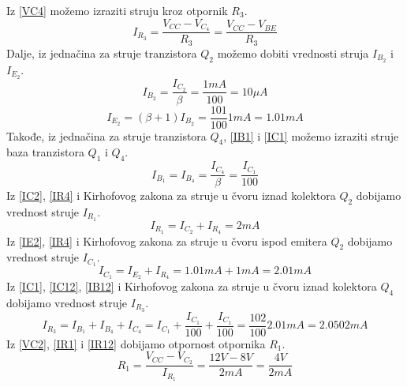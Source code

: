 \documentclass{article}
\begin{document}
            Iz \eqref{VC4} možemo izraziti struju kroz otpornik $R_3$.
            \begin{equation}
                \label{IR3}
                I_{R_3} = \frac{V_{CC} - V_{C_4}}{R_3} = \frac{V_{CC} - V_{BE}}{R_3}
            \end{equation}
            Dalje, iz jednačina za struje tranzistora $Q_2$ možemo dobiti vrednosti struja $I_{B_2}$ i $I_{E_2}$.
            \begin{equation}
                \label{IB22}
                I_{B_2} = \frac{I_{C_2}}{\beta} = \frac{1mA}{100} = 10\mu A
            \end{equation}
            \begin{equation}
                \label{IE2}
                I_{E_2} = (\beta + 1) I_{B_2} = \frac{101}{100} 1mA = 1.01mA
            \end{equation}
            Takođe, iz jednačina za struje tranzistora $Q_4$, \eqref{IB1} i \eqref{IC1} možemo izraziti struje baza tranzistora $Q_1$ i $Q_4$.
            \begin{equation}
                \label{IB12}
                I_{B_1} = I_{B_4} = \frac{I_{C_4}}{\beta} = \frac{I_{C_1}}{100}
            \end{equation}
            Iz \eqref{IC2}, \eqref{IR4} i Kirhofovog zakona za struje u čvoru iznad kolektora $Q_2$ dobijamo vrednost struje $I_{R_1}$.
            \begin{equation}
                \label{IR12}
                I_{R_1} = I_{C_2} + I_{R_4} = 2mA
            \end{equation}
            Iz \eqref{IE2}, \eqref{IR4} i Kirhofovog zakona za struje u čvoru ispod emitera $Q_2$ dobijamo vrednost struje $I_{C_1}$.
            \begin{equation}
                \label{IC12}
                I_{C_1} = I_{E_2} + I_{R_4} = 1.01mA + 1mA = 2.01mA
            \end{equation}
            Iz \eqref{IC1}, \eqref{IC12}, \eqref{IB12} i Kirhofovog zakona za struje u čvoru iznad kolektora $Q_4$ dobijamo vrednost struje $I_{R_3}$.
            \begin{equation}
                \label{IR31}
                I_{R_3} = I_{B_1} + I_{B_4} + I_{C_4} = I_{C_1} + \frac{I_{C_1}}{100} + \frac{I_{C_1}}{100} = \frac{102}{100} 2.01mA = 2.0502mA
            \end{equation}
            Iz \eqref{VC2}, \eqref{IR1} i \eqref{IR12} dobijamo otpornost otpornika $R_1$.
            $$R_1 = \frac{V_{CC} - V_{C_2}}{I_{R_1}} = \frac{12V - 8V}{2mA} = \frac{4V}{2mA}$$
\end{document}
